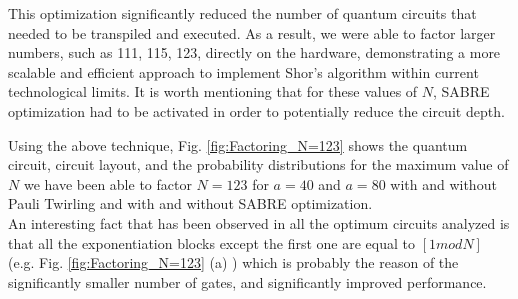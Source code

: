 \documentclass[conference,twoside]{IEEEtran}
\begin{document}
This optimization significantly reduced the number of quantum circuits that needed to be transpiled and executed. As a result, we were able to factor larger numbers, such as 111, 115, 123, directly on the hardware, demonstrating a more scalable and efficient approach to implement Shor’s algorithm within current technological limits. It is worth mentioning that for these values of $N$, SABRE optimization had to be activated in order to potentially reduce the circuit depth.

Using the above technique, Fig. \ref{fig:Factoring_N=123} shows the quantum circuit, circuit layout, and the probability distributions for the maximum value of $N$ we have been able to factor $N = 123$ for $a = 40$ and $a=80$ with and without Pauli Twirling and with and without SABRE optimization. 
\\
An interesting fact that has been observed in all the optimum circuits analyzed is that all the exponentiation blocks except the first one are equal to $[1 mod N]$ (e.g. Fig. \ref{fig:Factoring_N=123} (a) ) which is probably the reason of the significantly smaller number of gates, and significantly improved performance.
\end{document}
